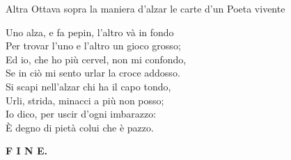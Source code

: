 \documentclass[11pt,a6paper]{article}
\begin{document}
Altra Ottava sopra la maniera d'alzar
le carte d'un Poeta vivente

\vspace{6pt}

\noindent
\begin{minipage}{8cm}
{\LARGE U}no alza, e fa pepin, l'altro và in fondo\\
Per trovar l'uno e l'altro un gioco grosso; \vspace{2pt}\\ 
Ed io, che ho più cervel, non mi confondo, \\
Se in ciò mi sento urlar la croce addosso. \vspace{2pt}\\
Si scapi nell'alzar chi ha il capo tondo, \\
Urli, strida, minacci a più non posso; \vspace{2pt}\\
Io dico, per uscir d'ogni imbarazzo: \\
È degno di pietà colui che è pazzo. 
\end{minipage}

\vspace{48pt}

\huge\bfseries\centering F I N E.
\end{document}

